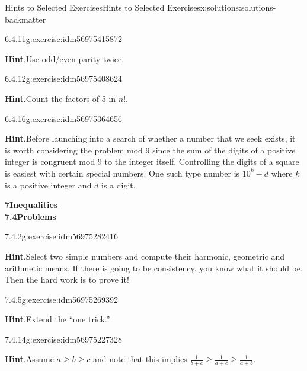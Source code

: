 \documentclass[twoside,10pt,]{book}
\newcommand{\blocktitlefont}{\relax}
\numberwithin{equation}{section}
\begin{document}
\begin{solutions-chapter}{Hints  to Selected Exercises}{}{Hints  to Selected Exercises}{}{}{x:solutions:solutions-backmatter}
\begin{divisionsolution}{6.4.11}{}{g:exercise:idm56975415872}
\par\smallskip%
\noindent\textbf{\blocktitlefont Hint}.\hypertarget{g:hint:idm56975412160-back}{}\quad{}Use odd\slash{}even parity twice.%
\end{divisionsolution}%
\begin{divisionsolution}{6.4.12}{}{g:exercise:idm56975408624}%
\par\smallskip%
\noindent\textbf{\blocktitlefont Hint}.\hypertarget{g:hint:idm56975403472-back}{}\quad{}Count the factors of 5 in \(n!\).%
\end{divisionsolution}%
\begin{divisionsolution}{6.4.16}{}{g:exercise:idm56975364656}%
\par\smallskip%
\noindent\textbf{\blocktitlefont Hint}.\hypertarget{g:hint:idm56975359216-back}{}\quad{}Before launching into a search of whether a number that we seek exists, it is worth considering the problem mod 9 since the sum of the digits of a positive integer is congruent mod 9 to the integer itself.   Controlling the digits of a square is easiest with certain special numbers.   One such type number is \(10^k-d\) where \(k\) is a positive integer and \(d\) is a digit.%
\end{divisionsolution}%
\par\medskip
\noindent\textbf{\Large{}7\space\textperiodcentered\space{}Inequalities\\
7.4\space\textperiodcentered\space{}Problems}
\begin{divisionsolution}{7.4.2}{}{g:exercise:idm56975282416}%
\par\smallskip%
\noindent\textbf{\blocktitlefont Hint}.\hypertarget{g:hint:idm56975279456-back}{}\quad{}Select two simple numbers and compute their harmonic, geometric and arithmetic means.  If there is going to be consistency, you know what it should be.  Then the hard work is to prove it!%
\end{divisionsolution}%
\begin{divisionsolution}{7.4.5}{}{g:exercise:idm56975269392}%
\par\smallskip%
\noindent\textbf{\blocktitlefont Hint}.\hypertarget{g:hint:idm56975267088-back}{}\quad{}Extend the ``one trick.''%
\end{divisionsolution}%
\begin{divisionsolution}{7.4.14}{}{g:exercise:idm56975227328}%
\par\smallskip%
\noindent\textbf{\blocktitlefont Hint}.\hypertarget{g:hint:idm56975225376-back}{}\quad{}Assume \(a \ge b \ge c\) and note that this implies \(\frac{1}{b+c} \ge \frac{1}{a+c} \ge \frac{1}{a+b}\).%

\end{divisionsolution}
\end{solutions-chapter}
\end{document}
